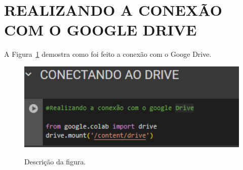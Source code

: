 \section{REALIZANDO A CONEXÃO COM O GOOGLE DRIVE    }
	\label{sec:identificao}
\label{sec:figura}
A Figura~\ref{figuras/figuras/cconfiguraçao-.analise-vendas.} demostra como foi feito a conexão com o Googe Drive.
\begin{figure}[!ht]
	{\centering
		\caption{Descrição da figura.}
		\includegraphics[width=1.0\textwidth]{figuras/configuraçao- resumo.png}
		\label{figuras/figuras/cconfiguraçao-.analise-vendas.}
	}
\end{figure} \\ \\ \\ \\ \\ \\ \\ \\ \\ \\ \\ \\ \\ \\ \\ \\ \\ \\ \\ \\ \\ 

